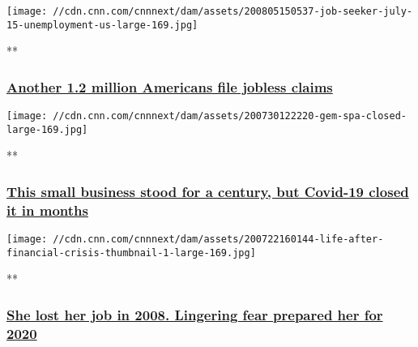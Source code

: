 \href{/videos/business/2020/08/06/jobless-claims-unemployment-benefits-coronavirus.cnnbusiness/video/playlists/business-economy/}{}

\texttt{[image: //cdn.cnn.com/cnnnext/dam/assets/200805150537-job-seeker-july-15-unemployment-us-large-169.jpg]}

**

\hypertarget{another-12-million-americans-file-jobless-claims}{%
\subsubsection{\texorpdfstring{\href{/videos/business/2020/08/06/jobless-claims-unemployment-benefits-coronavirus.cnnbusiness/video/playlists/business-economy/}{Another
1.2 million Americans file jobless
claims}}{Another 1.2 million Americans file jobless claims}}\label{another-12-million-americans-file-jobless-claims}}

\href{/videos/business/2020/07/30/small-businesses-restaurants-economy-unemployment-covid-19.cnnbusiness/video/playlists/business-economy/}{}

\texttt{[image: //cdn.cnn.com/cnnnext/dam/assets/200730122220-gem-spa-closed-large-169.jpg]}

**

\hypertarget{this-small-business-stood-for-a-century-but-covid-19-closed-it-in-months}{%
\subsubsection{\texorpdfstring{\href{/videos/business/2020/07/30/small-businesses-restaurants-economy-unemployment-covid-19.cnnbusiness/video/playlists/business-economy/}{This
small business stood for a century, but Covid-19 closed it in
months}}{This small business stood for a century, but Covid-19 closed it in months}}\label{this-small-business-stood-for-a-century-but-covid-19-closed-it-in-months}}

\href{/videos/business/2020/07/22/laid-off-during-great-recession-life-after-orig-mss.cnn/video/playlists/business-economy/}{}

\texttt{[image: //cdn.cnn.com/cnnnext/dam/assets/200722160144-life-after-financial-crisis-thumbnail-1-large-169.jpg]}

**

\hypertarget{she-lost-her-job-in-2008-lingering-fear-prepared-her-for-2020}{%
\subsubsection{\texorpdfstring{\href{/videos/business/2020/07/22/laid-off-during-great-recession-life-after-orig-mss.cnn/video/playlists/business-economy/}{She
lost her job in 2008. Lingering fear prepared her for
2020}}{She lost her job in 2008. Lingering fear prepared her for 2020}}\label{she-lost-her-job-in-2008-lingering-fear-prepared-her-for-2020}}

